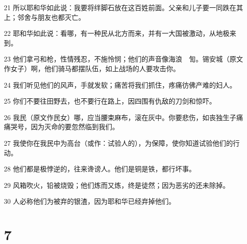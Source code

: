 \par 21 所以耶和华如此说：我要将绊脚石放在这百姓前面。父亲和儿子要一同跌在其上；邻舍与朋友也都灭亡。
\par 22 耶和华如此说：看哪，有一种民从北方而来，并有一大国被激动，从地极来到。
\par 23 他们拿弓和枪，性情残忍，不施怜悯；他们的声音像海浪　訇。锡安城（原文作女子）啊，他们骑马都摆队伍，如上战场的人要攻击你。
\par 24 我们听见他们的风声，手就发软；痛苦将我们抓住，疼痛彷佛产难的妇人。
\par 25 你们不要往田野去，也不要行在路上，因四围有仇敌的刀剑和惊吓。
\par 26 我民（原文作民女）哪，应当腰束麻布，滚在灰中。你要悲伤，如丧独生子痛痛哭号，因为灭命的要忽然临到我们。
\par 27 我使你在我民中为高台（或作：试验人的），为保障，使你知道试验他们的行动。
\par 28 他们都是极悖逆的，往来谗谤人。他们是铜是铁，都行坏事。
\par 29 风箱吹火，铅被烧毁；他们炼而又炼，终是徒然；因为恶劣的还未除掉。
\par 30 人必称他们为被弃的银渣，因为耶和华已经弃掉他们。

\chapter{7}

